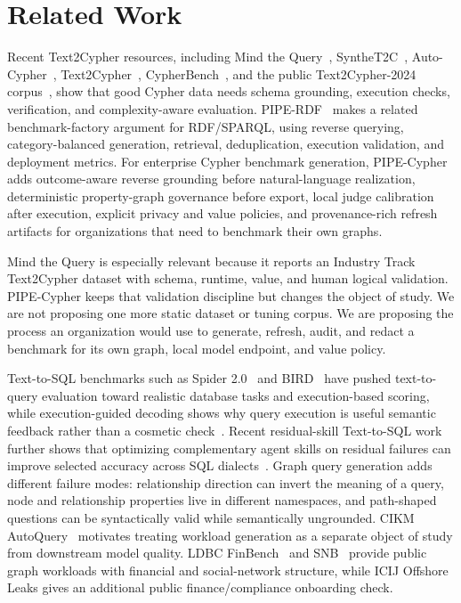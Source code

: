 \documentclass[11pt]{article}
\begin{document}
\section{Related Work}
Recent Text2Cypher resources, including Mind the Query~\citep{mindthequery2025}, SyntheT2C~\citep{synthet2c2025}, Auto-Cypher~\citep{autocypher2025}, Text2Cypher~\citep{text2cypher2025}, CypherBench~\citep{cypherbench2025}, and the public Text2Cypher-2024 corpus~\citep{text2cypher2024dataset}, show that good Cypher data needs schema grounding, execution checks, verification, and complexity-aware evaluation. PIPE-RDF~\citep{ranganath2026piperd} makes a related benchmark-factory argument for RDF/SPARQL, using reverse querying, category-balanced generation, retrieval, deduplication, execution validation, and deployment metrics. For enterprise Cypher benchmark generation, PIPE-Cypher adds outcome-aware reverse grounding before natural-language realization, deterministic property-graph governance before export, local judge calibration after execution, explicit privacy and value policies, and provenance-rich refresh artifacts for organizations that need to benchmark their own graphs.

Mind the Query is especially relevant because it reports an Industry Track Text2Cypher dataset with schema, runtime, value, and human logical validation. PIPE-Cypher keeps that validation discipline but changes the object of study. We are not proposing one more static dataset or tuning corpus. We are proposing the process an organization would use to generate, refresh, audit, and redact a benchmark for its own graph, local model endpoint, and value policy.

Text-to-SQL benchmarks such as Spider 2.0~\citep{spider22024} and BIRD~\citep{bird2023} have pushed text-to-query evaluation toward realistic database tasks and execution-based scoring, while execution-guided decoding shows why query execution is useful semantic feedback rather than a cosmetic check~\citep{wang2018executionguidedtexttosql}. Recent residual-skill Text-to-SQL work further shows that optimizing complementary agent skills on residual failures can improve selected accuracy across SQL dialects~\citep{zhu2026residualskilloptimizationtexttosql}. Graph query generation adds different failure modes: relationship direction can invert the meaning of a query, node and relationship properties live in different namespaces, and path-shaped questions can be syntactically valid while semantically ungrounded. CIKM AutoQuery~\citep{autoquery2024} motivates treating workload generation as a separate object of study from downstream model quality. LDBC FinBench~\citep{ldbcfinbench} and SNB~\citep{ldbcsnb} provide public graph workloads with financial and social-network structure, while ICIJ Offshore Leaks gives an additional public finance/compliance onboarding check.
\end{document}
